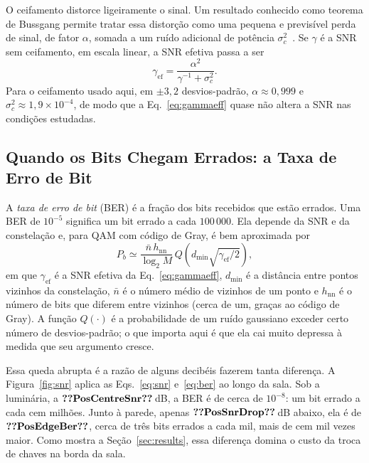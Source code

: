 O ceifamento distorce ligeiramente o sinal. Um resultado conhecido como
teorema de Bussgang permite tratar essa distorção como uma pequena e previsível
perda de sinal, de fator $\alpha$, somada a um ruído adicional de potência
$\sigma_c^{2}$~\cite{dimitrov2013information}. Se $\gamma$ é a SNR sem
ceifamento, em escala linear, a SNR efetiva passa a ser
\begin{equation}
\gamma_{\mathrm{ef}} = \frac{\alpha^{2}}{\gamma^{-1} + \sigma_c^{2}}.
\label{eq:gammaeff}
\end{equation}
Para o ceifamento usado aqui, em $\pm3{,}2$ desvios-padrão, $\alpha\approx0{,}999$
e $\sigma_c^{2}\approx1{,}9\times10^{-4}$, de modo que a
Eq.~\eqref{eq:gammaeff} quase não altera a SNR nas condições estudadas.

\subsection{Quando os Bits Chegam Errados: a Taxa de Erro de Bit}\label{sec:fund-ber}
A \emph{taxa de erro de bit} (BER) é a fração dos bits recebidos que estão
errados. Uma BER de $10^{-5}$ significa um bit errado a cada $100\,000$. Ela
depende da SNR e da constelação e, para QAM com código de Gray, é bem
aproximada por~\cite{proakis2008digital}
\begin{equation}
P_b \simeq \frac{\bar{n}\,h_{\mathrm{nn}}}{\log_2 M}\,
           Q\!\left(d_{\min}\sqrt{\gamma_{\mathrm{ef}}/2}\right),
\label{eq:ber}
\end{equation}
em que $\gamma_{\mathrm{ef}}$ é a SNR efetiva da Eq.~\eqref{eq:gammaeff},
$d_{\min}$ é a distância entre pontos vizinhos da constelação, $\bar{n}$ é o
número médio de vizinhos de um ponto e $h_{\mathrm{nn}}$ é o número de bits que
diferem entre vizinhos (cerca de um, graças ao código de Gray). A função
$Q(\cdot)$ é a probabilidade de um ruído gaussiano exceder certo número de
desvios-padrão; o que importa aqui é que ela cai muito depressa à medida que
seu argumento cresce.

Essa queda abrupta é a razão de alguns decibéis fazerem tanta diferença. A
Figura~\ref{fig:snr} aplica as Eqs.~\eqref{eq:snr} e~\eqref{eq:ber} ao longo da
sala. Sob a luminária, a $\val{PosCentreSnr}$\,dB, a BER é de cerca de
$10^{-8}$: um bit errado a cada cem milhões. Junto à parede, apenas
$\val{PosSnrDrop}$\,dB abaixo, ela é de $\val{PosEdgeBer}$, cerca de três bits
errados a cada mil, mais de cem mil vezes maior. Como mostra a
Seção~\ref{sec:results}, essa diferença domina o custo da troca de chaves na
borda da sala.

